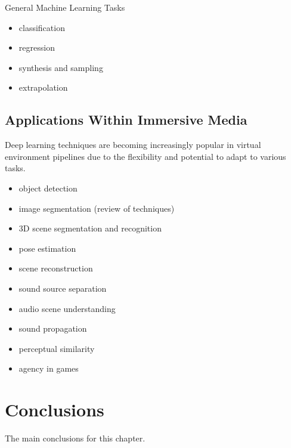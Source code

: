 General Machine Learning Tasks

\cite{goodfellow2016deep}
\begin{itemize}
    \item classification
    \item regression
    \item synthesis and sampling
    \item extrapolation
\end{itemize}


\subsection{Applications Within Immersive Media}
Deep learning techniques are becoming increasingly popular in virtual environment pipelines due to the flexibility and potential to adapt to various tasks. 
\begin{itemize}
    \item object detection \cite{szeliski2022computer, Redmon_2016_CVPR}
    \item image segmentation \cite{minae_segmentation} (review of techniques)
    \item 3D scene segmentation and recognition \cite{kalogerakis20173d}
    \item pose estimation \cite{andriluka20142d}
    \item scene reconstruction \cite{patow2003survey}
    \item sound source separation \cite{virtanen2006sound}
    \item audio scene understanding \cite{abesser2020review}
    \item sound propagation \cite{liu2022sound}
    \item perceptual similarity \cite{Dolhasz_2020_CVPR}
    \item agency in games \cite{yannakakis2018artificial}
\end{itemize}


 

\section{Conclusions}

The main conclusions for this chapter.


